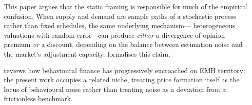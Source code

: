 This paper argues that the static framing is responsible for much of the
empirical confusion. When supply and demand are sample paths of a stochastic
process rather than fixed schedules, the same underlying mechanism---
heterogeneous valuations with random error---can produce \emph{either} a
divergence-of-opinion premium \emph{or} a discount, depending on the
balance between estimation noise and the market's adjustment capacity.
 formalises this claim.

\citet{shiller2003} reviews how behavioural finance has progressively
encroached on EMH territory; the present work occupies a related niche,
treating price formation itself as the locus of behavioural noise rather
than treating noise as a deviation from a frictionless benchmark.
